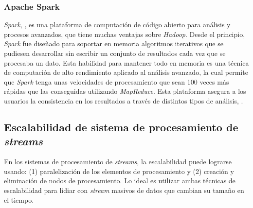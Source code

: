 \subsubsection*{Apache Spark}
\label{arte:SPS:spark}

\textit{Spark}, \cite{SparkOnline}, es una plataforma de computación de código abierto para análisis y procesos avanzados, que tiene muchas ventajas sobre \textit{Hadoop}. Desde el principio, \textit{Spark} fue diseñado para soportar en memoria algoritmos iterativos que se pudiesen desarrollar sin escribir un conjunto de resultados cada vez que se procesaba un dato. Esta habilidad para mantener todo en memoria es una técnica de computación de alto rendimiento aplicado al análisis avanzado, la cual permite que \textit{Spark} tenga unas velocidades de procesamiento que sean 100 veces más rápidas que las conseguidas utilizando \textit{MapReduce}. Esta plataforma asegura a los usuarios la consistencia en los resultados a través de distintos tipos de análisis, \cite{Spark}.

\subsection{Escalabilidad de sistema de procesamiento de \textit{streams}}
\label{arte:EscalabilidadSPS}

En los sistemas de procesamiento de \textit{streams}, la escalabilidad puede lograrse usando: (1) paralelización de los elementos de procesamiento y (2) creación y eliminación de nodos de procesamiento. Lo ideal es utilizar ambas técnicas de escalabilidad para lidiar con \textit{stream} masivos de datos que cambian su tamaño en el tiempo.

